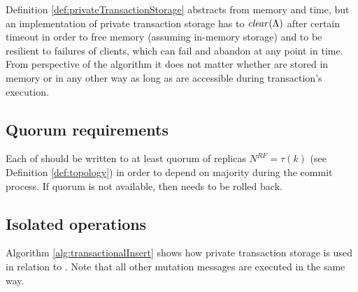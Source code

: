 Definition \ref{def:privateTransactionStorage} abstracts from memory and time, but an implementation of private transaction storage has to $\mathit{clear}(\text{$\Lambda$})$ after certain timeout in order to free memory (assuming in-memory storage) and to be resilient to failures of clients, which can fail and abandon \transactionj at any point in time. From perspective of the algorithm it does not matter whether \mutations are stored in memory or in any other way as long as \mutations are accessible during transaction's execution. 


\subsection{Quorum requirements}
Each  of \transactionj should be written to at least quorum of replicas $N^{RF} = \tau(k)$ (see Definition \ref{def:topology}) in order to depend on majority during the commit process. If quorum is not available, then \transactionj needs to be rolled back. 

\subsection{Isolated operations}
Algorithm \ref{alg:transactionalInsert} shows how private transaction storage is used in relation to \insertMessage. Note that all other mutation messages are executed in the same way. 

 
 
